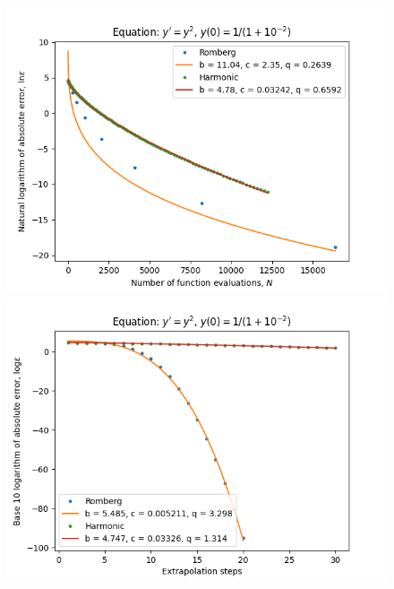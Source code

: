 \begin{figure}[H]
\centering
\begin{minipage}{0.45\textwidth}
\centering
\includegraphics[scale=0.45]{emr_plots/singularity_2_hp_trend.png}
\end{minipage}
\begin{minipage}{0.45\textwidth}
\centering
\includegraphics[scale=0.45]{emr_plots/singularity_2_hp_steps.png}
\end{minipage}
\end{figure}

